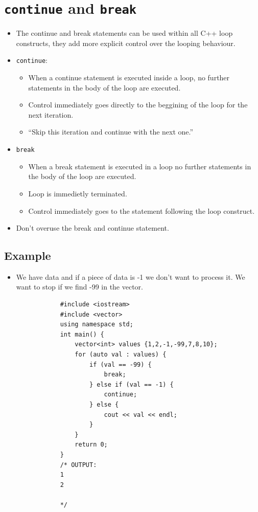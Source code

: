\section{\texttt{continue} and \texttt{break}}
\begin{itemize}
    \item The continue and break statements can be used within all C++ loop constructs, they add more explicit control over the looping behaviour. 
    \item \texttt{continue}: 
        \begin{itemize}
            \item When a continue statement is executed inside a loop, no further statements in the body of the loop are executed.
            \item Control immediately goes directly to the beggining of the loop for the next iteration.
            \item ``Skip this iteration and continue with the next one.''
        \end{itemize}
    
    \item \texttt{break}
        \begin{itemize}
            \item When a break statement is executed in a loop no further statements in the body of the loop are executed.
            \item Loop is immedietly terminated.
            \item Control immediately goes to the statement following the loop construct.
        \end{itemize}
    
    \item Don't overuse the break and continue statement.
\end{itemize}

\subsection{Example}
\begin{itemize}
    \item We have data and if a piece of data is -1 we don't want to process it. We want to stop if we find -99 in the vector.
        \begin{verbatim}
            #include <iostream>
            #include <vector>
            using namespace std;
            int main() {
                vector<int> values {1,2,-1,-99,7,8,10};
                for (auto val : values) {
                    if (val == -99) {
                        break;
                    } else if (val == -1) {
                        continue;
                    } else {
                        cout << val << endl;
                    }
                }
                return 0;
            }
            /* OUTPUT:
            1
            2

            */
        \end{verbatim}
\end{itemize}


